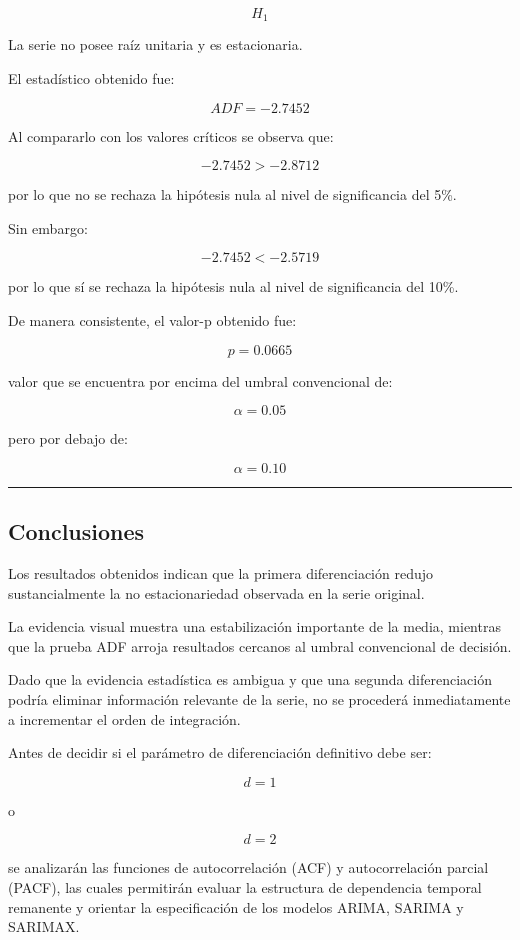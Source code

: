 \documentclass[11pt]{article}
\begin{document}
\[
H_1
\]

La serie no posee raíz unitaria y es estacionaria.

El estadístico obtenido fue:

\[
ADF=-2.7452
\]

Al compararlo con los valores críticos se observa que:

\[
-2.7452 > -2.8712
\]

por lo que no se rechaza la hipótesis nula al nivel de significancia del
5\%.

Sin embargo:

\[
-2.7452 < -2.5719
\]

por lo que sí se rechaza la hipótesis nula al nivel de significancia del
10\%.

De manera consistente, el valor-p obtenido fue:

\[
p=0.0665
\]

valor que se encuentra por encima del umbral convencional de:

\[
\alpha=0.05
\]

pero por debajo de:

\[
\alpha=0.10
\]

\begin{center}\rule{0.5\linewidth}{0.5pt}\end{center}

\hypertarget{conclusiones}{%
\subsection{Conclusiones}\label{conclusiones}}

Los resultados obtenidos indican que la primera diferenciación redujo
sustancialmente la no estacionariedad observada en la serie original.

La evidencia visual muestra una estabilización importante de la media,
mientras que la prueba ADF arroja resultados cercanos al umbral
convencional de decisión.

Dado que la evidencia estadística es ambigua y que una segunda
diferenciación podría eliminar información relevante de la serie, no se
procederá inmediatamente a incrementar el orden de integración.

Antes de decidir si el parámetro de diferenciación definitivo debe ser:

\[
d=1
\]

o

\[
d=2
\]

se analizarán las funciones de autocorrelación (ACF) y autocorrelación
parcial (PACF), las cuales permitirán evaluar la estructura de
dependencia temporal remanente y orientar la especificación de los
modelos ARIMA, SARIMA y SARIMAX.
\end{document}

